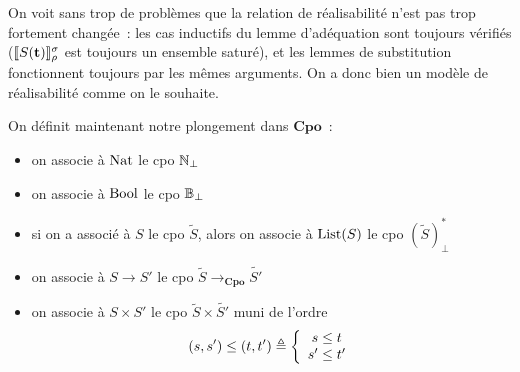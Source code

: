 \documentclass{article}
\begin{document}
On voit sans trop de problèmes que la relation de réalisabilité n'est pas trop fortement changée~: les cas inductifs du lemme d'adéquation sont toujours vérifiés ($\llbracket S(\mathbf{t}) \rrbracket_\rho^\sigma$ est toujours un ensemble saturé), et les lemmes de substitution fonctionnent toujours par les mêmes arguments. On a donc bien un modèle de réalisabilité comme on le souhaite.

On définit maintenant notre plongement dans $\mathbf{Cpo}$~:
\begin{itemize}
    \item on associe à $\mathrm{Nat}$ le cpo $\mathbb{N}_\bot$
    \item on associe à $\mathrm{Bool}$ le cpo $\mathbb{B}_\bot$
    \item si on a associé à $S$ le cpo $\tilde S$, alors on associe à $\mathrm{List}(S)$ le cpo $(\tilde S)^*_\bot$
    \item on associe à $S \to S'$ le cpo $\tilde S \to_{\mathbf{Cpo}} \tilde{S'}$
    \item on associe à $S \times S'$ le cpo $\tilde S \times \tilde{S'}$ muni de l'ordre
    \[(s,s') \leq (t,t') \triangleq \left\{\begin{array}{c}
        s \leq t \\
        s' \leq t'
    \end{array}\right.\]
\end{itemize}
\end{document}
